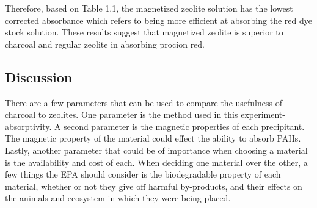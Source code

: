 \documentclass[11pt]{article} %
\begin{document}
\begin{table}[H]
\caption{The concentration of each solution and its absorbance at $\lambda_{\text{max}}$.}
\end{table}

Therefore, based on Table 1.1, the magnetized zeolite solution has the lowest corrected absorbance which refers to being more efficient at absorbing the red dye stock solution. These results suggest that magnetized zeolite is superior to charcoal and regular zeolite in absorbing procion red.

\subsection{Discussion}
There are a few parameters that can be used to compare the usefulness of charcoal to zeolites. One parameter is the method used in this experiment-absorptivity. A second parameter is the magnetic properties of each precipitant. The magnetic property of the material could effect the ability to absorb PAHs. Lastly, another parameter that could be of importance when choosing a material is the availability and cost of each. When deciding one material over the other, a few things the EPA should consider is the biodegradable property of each material, whether or not they give off harmful by-products, and their effects on the animals and ecosystem in which they were being placed.
\end{document}
